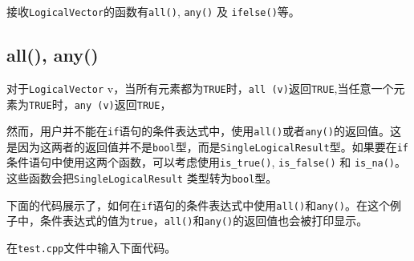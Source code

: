 \documentclass[]{ctexbook}
\begin{document}
接收\texttt{LogicalVector}的函数有\texttt{all()}, \texttt{any()} 及
\texttt{ifelse()}等。

\subsection{all(), any()}\label{all-any}

对于\texttt{LogicalVector}
v，当所有元素都为\texttt{TRUE}时，\texttt{all\ (v)}返回\texttt{TRUE},当任意一个元素为\texttt{TRUE}时，\texttt{any\ (v)}返回\texttt{TRUE}，

然而，用户并不能在\texttt{if}语句的条件表达式中，使用\texttt{all()}或者\texttt{any()}的返回值。这是因为这两者的返回值并不是\texttt{bool}型，而是\texttt{SingleLogicalResult}型。如果要在\texttt{if}条件语句中使用这两个函数，可以考虑使用\texttt{is\_true()},
\texttt{is\_false()} 和
\texttt{is\_na()}。这些函数会把\texttt{SingleLogicalResult}
类型转为\texttt{bool}型。

下面的代码展示了，如何在\texttt{if}语句的条件表达式中使用\texttt{all()}和\texttt{any()}。在这个例子中，条件表达式的值为\texttt{true}，\texttt{all()}和\texttt{any()}的返回值也会被打印显示。

在\texttt{test.cpp}文件中输入下面代码。
\end{document}
